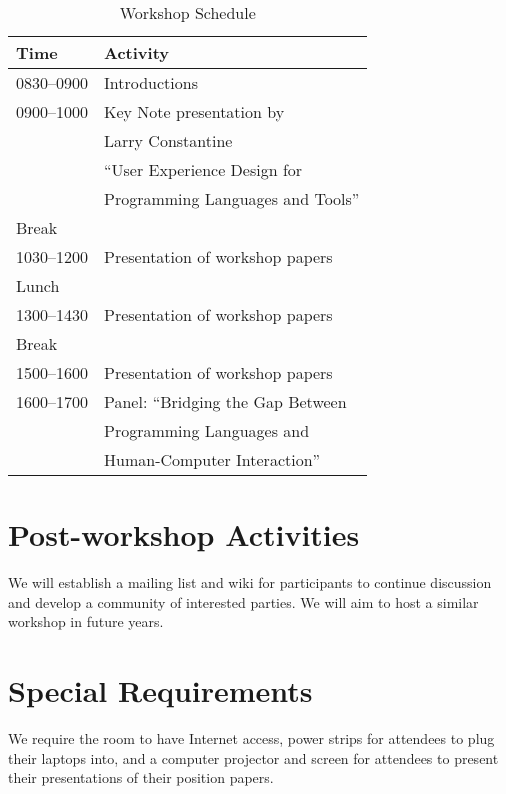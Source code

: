 \documentclass{acm_proc_article-sp}
\begin{document}
\begin{table} [!htbp] %
\begin{tabularx}{\columnwidth}{l|X}
\textbf{Time}   & \textbf{Activity} \\
\hline
0830--0900    & Introductions \vspace{1mm} \\
0900--1000    & Key Note presentation by \\
                & Larry Constantine\\
                & ``User Experience Design for \\
                & Programming Languages and Tools'' \vspace{1mm} \\
Break              & ~\vspace{1mm}\\
1030--1200   & Presentation of workshop papers \vspace{1mm}\\
Lunch             & ~\vspace{1mm}\\
1300--1430   & Presentation of workshop papers \vspace{1mm}\\
Break              & ~\vspace{1mm}\\
1500--1600    & Presentation of workshop papers \vspace{1mm}\\
1600--1700    & Panel: ``Bridging the Gap Between\\
                     & Programming Languages and\\
                     & Human-Computer Interaction'' \\

\end{tabularx}
\caption{Workshop Schedule}
\label{tab:schedule}
\end{table}

\section{Post-workshop Activities}

We will establish a mailing list and wiki for participants 
to continue discussion and develop a community of 
interested parties. 
We will aim to host a similar workshop in future years.

\section{Special Requirements}

We require the room to have Internet access, power strips for
attendees to plug their laptops into, and a computer projector and
screen for attendees to present their presentations of their position
papers.

% 
%  
\end{document}
